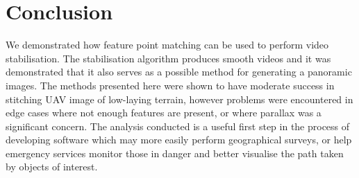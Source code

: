 \section{Conclusion}

We demonstrated how feature point matching can be used to perform video stabilisation.
The stabilisation algorithm produces smooth videos and it was demonstrated that it also serves as a possible method for generating a panoramic images.
The methods presented here were shown to have moderate success in stitching UAV image of low-laying terrain, however problems were encountered in edge cases where not enough features are present,
or where parallax was a significant concern.
The analysis conducted is a useful first step in the process of developing software which may more easily perform geographical surveys, or help emergency services monitor those in danger and better visualise the path taken by objects of interest.
